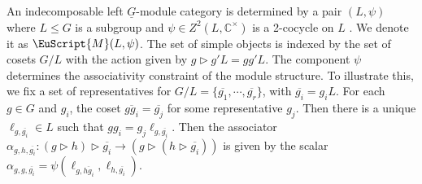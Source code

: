 \documentclass[a4paper,11pt]{article}
\theoremstyle{definition}
\theoremstyle{remark}
\newcommand\eM          {\EuScript{M}}
\begin{document}
An indecomposable left $\underline{G}$-module category is determined by a pair $(L,\psi)$ where $L\leq G$ is a subgroup and $\psi\in Z^2(L,\mathbb{C}^\times)$ is a 2-cocycle on $L$ \cite[Example 7.4.10]{etingof2016tensor}. We denote it as $\eM(L,\psi)$. The set of simple objects is indexed by the set of cosets $G/L$ with the action given by $g \triangleright g'L = gg'L$. The component $\psi$ determines the associativity constraint of the module structure. To illustrate this, we fix a set of representatives for $G/L = \{\overline{g_1},\cdots,\overline{g_r}\}$, with $\overline{g_i}=g_iL$. For each $g\in G$ and $g_i$, the coset $\overline{gg_i} = \overline{g_j}$ for some representative $g_j$. Then there is a unique $\ell_{g,\overline{g_i}}\in L$ such that $gg_i=g_j\ell_{g,\overline{g_i}}$. 
Then the associator $\alpha_{g,h,\overline{g_i}}:(g\triangleright h)\triangleright \overline{g_i}\to (g\triangleright (h\triangleright \overline{g_i}))$ is given by the scalar $\alpha_{g,g,\overline{g_i}}=\psi(\ell_{g,\overline{hg_i}},\ell_{h,\overline{g_i}})$.
\end{document}
